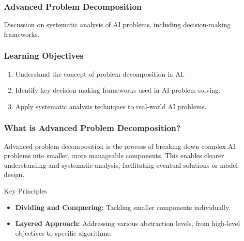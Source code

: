 \documentclass[aspectratio=169]{beamer}
\begin{document}
\begin{frame}[fragile]
    \frametitle{Advanced Problem Decomposition}
    Discussion on systematic analysis of AI problems, including decision-making frameworks.
\end{frame}

\begin{frame}[fragile]
    \frametitle{Learning Objectives}
    \begin{enumerate}
        \item Understand the concept of problem decomposition in AI.
        \item Identify key decision-making frameworks used in AI problem-solving.
        \item Apply systematic analysis techniques to real-world AI problems.
    \end{enumerate}
\end{frame}

\begin{frame}[fragile]
    \frametitle{What is Advanced Problem Decomposition?}
    Advanced problem decomposition is the process of breaking down complex AI problems into smaller, more manageable components. This enables clearer understanding and systematic analysis, facilitating eventual solutions or model design.
    
    \begin{block}{Key Principles}
        \begin{itemize}
            \item \textbf{Dividing and Conquering:} Tackling smaller components individually.
            \item \textbf{Layered Approach:} Addressing various abstraction levels, from high-level objectives to specific algorithms.
        \end{itemize}
    \end{block}
\end{frame}
\end{document}
